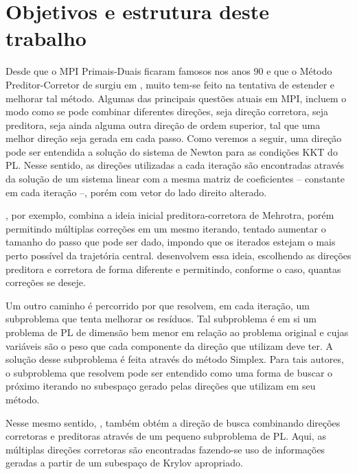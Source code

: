 


\section*{Objetivos e estrutura deste trabalho}




Desde que o   \acf{MPI} Primais-Duais ficaram famosos nos anos 90 e que o Método Preditor-Corretor de \textcite{Mehrotra:1992wr} surgiu em \citeyear{Mehrotra:1992wr}, muito tem-se feito na tentativa de estender e melhorar tal método. Algumas das principais questões atuais em \ac{MPI}, incluem o modo como se pode combinar diferentes direções, seja direção corretora, seja preditora, seja ainda alguma outra direção de  ordem superior, tal que uma melhor direção seja gerada em cada passo.  Como veremos a seguir, uma direção pode ser entendida a solução do sistema de Newton para as condições KKT do \ac{PL}. Nesse sentido, as direções utilizadas a cada iteração são encontradas através da solução de um sistema linear com a mesma matriz de coeficientes  -- constante em cada iteração --, porém com vetor do lado direito alterado.


\textcite{Gondzio:1996uw}, por exemplo, combina a ideia inicial preditora-corretora de Mehrotra, porém permitindo múltiplas correções em um mesmo iterando, tentado aumentar o tamanho do passo que pode ser dado, impondo que os iterados estejam o mais perto possível da trajetória central. \textcite{Colombo:2008ia} desenvolvem essa ideia, escolhendo as direções preditora e corretora de forma diferente e permitindo, conforme o caso, quantas correções se deseje. 

Um outro caminho é percorrido por \textcite{Jarre:1999tl} que resolvem, em cada iteração, um subproblema que tenta melhorar os resíduos. Tal subproblema  é em si um problema de PL de dimensão bem  menor em relação ao problema original e cujas variáveis são o peso que cada componente da direção que utilizam deve ter. A solução desse subproblema é feita através do método Simplex. Para tais autores, o subproblema que resolvem pode ser entendido como uma forma de buscar o próximo iterando no subespaço gerado pelas direções que utilizam em seu método.


Nesse mesmo sentido, \textcite{Mehrotra:2005do}, também obtém a direção de busca combinando direções corretoras e preditoras  através de um pequeno subproblema de \ac{PL}. Aqui, as múltiplas  direções corretoras são encontradas fazendo-se uso de informações geradas a partir de um  subespaço de Krylov apropriado.



